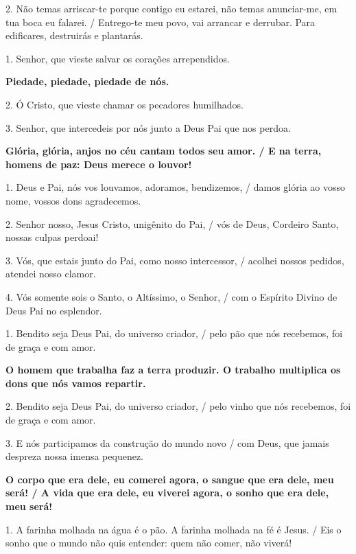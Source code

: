 \documentclass[a5paper,9pt]{extarticle}
\begin{document}
\begin{cantos}
\begin{canto}
2. Não temas arriscar-te porque contigo eu estarei, não temas anunciar-me, em tua boca eu falarei. / Entrego-te meu povo, vai arrancar e derrubar. Para edificares, destruirás e plantarás.
\end{canto}

\begin{canto}
1. Senhor, que vieste salvar os corações arrependidos.

\textbf{Piedade, piedade, piedade de nós. }

2. Ó Cristo, que vieste chamar os pecadores humilhados.

3. Senhor, que intercedeis por nós junto a Deus Pai que nos perdoa.
\end{canto}

\begin{canto}
\textbf{Glória, glória, anjos no céu cantam todos seu amor. / E na terra, homens de paz: Deus merece o louvor!}

1. Deus e Pai, nós vos louvamos, adoramos, bendizemos, / damos glória ao vosso nome, vossos dons agradecemos.

2. Senhor nosso, Jesus Cristo, unigênito do Pai, / vós de Deus, Cordeiro Santo, nossas culpas perdoai!

3. Vós, que estais junto do Pai, como nosso intercessor, / acolhei nossos pedidos, atendei nosso clamor.

4. Vós somente sois o Santo, o Altíssimo, o Senhor, / com o Espírito Divino de Deus Pai no esplendor.
\end{canto}

\begin{canto}
1. Bendito seja Deus Pai, do universo criador, / pelo pão que nós recebemos, foi de graça e com amor.

\textbf{O homem que trabalha faz a terra produzir. O trabalho multiplica os dons que nós vamos repartir.}

2. Bendito seja Deus Pai, do universo criador, / pelo vinho que nós recebemos, foi de graça e com amor.

3. E nós participamos da construção do mundo novo / com Deus, que jamais despreza nossa imensa pequenez.
\end{canto}

\begin{canto}
\textbf{O corpo que era dele, eu comerei agora, o sangue que era dele, meu será! / A vida que era dele, eu viverei agora, o sonho que era dele, meu será!}

1. A farinha molhada na água é o pão. A farinha molhada na fé é Jesus. / Eis o sonho que o mundo não quis entender: quem não comer, não viverá!


\end{canto}
\end{cantos}
\end{document}
